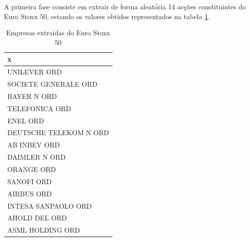 \documentclass[
  12pt,
  a4paper,
  openany]{book}
\newenvironment{Shaded}{\begin{snugshade}}{\end{snugshade}}
\newcommand{\DataTypeTok}[1]{\textcolor[rgb]{0.13,0.29,0.53}{#1}}
\newcommand{\DecValTok}[1]{\textcolor[rgb]{0.00,0.00,0.81}{#1}}
\newcommand{\KeywordTok}[1]{\textcolor[rgb]{0.13,0.29,0.53}{\textbf{#1}}}
\newcommand{\NormalTok}[1]{#1}
\newcommand{\OperatorTok}[1]{\textcolor[rgb]{0.81,0.36,0.00}{\textbf{#1}}}
\newcommand{\OtherTok}[1]{\textcolor[rgb]{0.56,0.35,0.01}{#1}}
\newcommand{\StringTok}[1]{\textcolor[rgb]{0.31,0.60,0.02}{#1}}
\begin{document}
A primeira fase consiste em extrair de forma aleatória 14 acções constituintes do Euro Stoxx 50, estando os valores obtidos representados na tabela \ref{tab:nice-tab}.
\scriptsize

\begin{Shaded}
\end{Shaded}

\begin{table}[!h]

\caption{\label{tab:nice-tab}Empresas extraidas do Euro Stoxx 50}
\centering
\begin{tabular}[t]{l}
\toprule
x\\
\midrule
UNILEVER ORD\\
SOCIETE GENERALE ORD\\
BAYER N ORD\\
TELEFONICA ORD\\
ENEL ORD\\
\addlinespace
DEUTSCHE TELEKOM N ORD\\
AB INBEV ORD\\
DAIMLER N ORD\\
ORANGE ORD\\
SANOFI ORD\\
\addlinespace
AIRBUS ORD\\
INTESA SANPAOLO ORD\\
AHOLD DEL ORD\\
ASML HOLDING ORD\\
\bottomrule
\end{tabular}
\end{table}
\end{document}
